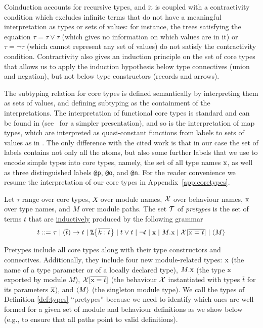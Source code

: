 \documentclass[a4paper,10pt]{article}
\begin{document}
Coinduction accounts for recursive types, and it is coupled with a
contractivity condition which excludes infinite terms
that do not have a meaningful interpretation as types or sets of values:
for instance, the trees satisfying the equation
$ \tau = \tau \lor \tau $
(which gives no information on which values are in it)
or $ \tau = \lnot \tau $ (which cannot represent any set of values) do not
satisfy the contractivity condition.
Contractivity also gives an induction principle on the set of core types that allows us to apply the induction hypothesis
below type connectives (union and negation),
but not below type constructors (records and arrows).

The subtyping relation for core types is defined semantically by interpreting them as sets of values,  and defining subtyping as the containment of the interpretations. The interpretation of functional core types is standard and can be found in \cite[Sections 3.1 and 4.2]{DubocThesis26} (see~\cite[Section 3.2]{Cas24} for a simpler presentation), and so is the interpretation of map types, which are interpreted as quasi-constant functions from labels to sets of values as in \cite{Cas23}. The only difference with the cited work is that in our case the set of labels contains not only all the atoms, but also some further labels that we use to encode simple types into core types, namely, the set of all type names $\text{\rm x}$, as well as three distinguished labels \texttt{@p}, \texttt{@o}, and \texttt{@n}. For the reader convenience we resume the interpretation of our core types in Appendix~\ref{app:coretypes}.

\begin{definition}[Pretypes]\label{def:types}
  Let $\tau$ range over core types, $X$ over module names, $\mathcal{X}$ over behaviour names, $\text{\rm x}$ over type names, and $M$ over module paths.
  The set $ \mathcal{T} $ of \emph{pretypes} is the set of terms $ t $
  that are \underline{inductively} produced by the following grammar
  \[
    t ::=  \tau \mid  (\overline{t}) \to t \mid \texttt{\%}\!\left\{\overline{k:t}\right\} \mid
    t \lor t \mid \lnot t \mid \text{\rm x} \mid M.\text{\rm x} \mid \mathcal{X}[\overline{\text{\rm x}=t}] \mid \langle M\rangle
  \]
\end{definition}
%
Pretypes include all core types along with their type constructors and connectives. Additionally, they include four new module-related types: $\text{\rm x}$ (the name of a type parameter or of a locally declared type), $M.\text{\rm x}$ (the type $\text{\rm x}$ exported by module $M$), $\mathcal{X}[\overline{\text{\rm x}=t}]$ (the behaviour $\mathcal{X}$ instantiated with types $\overline{t}$ for its parameters $\overline{\text{\rm x}}$), and $\langle M\rangle$ (the singleton module type). We call the types of Definition \ref{def:types} ``pretypes'' because we need to identify which ones are well-formed for a given set of module and behaviour definitions as we show below (e.g., to ensure that all paths point to valid definitions).
\end{document}
